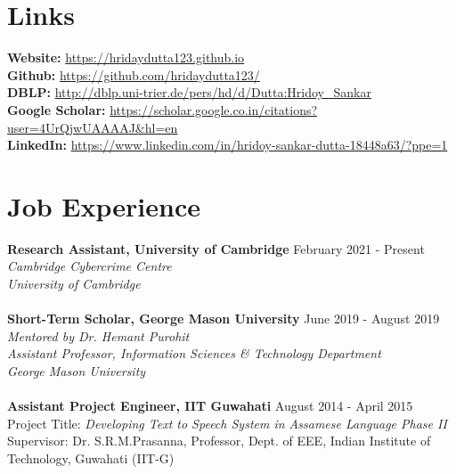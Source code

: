 \documentclass[margin, centered]{res}
\begin{document}
\begin{resume}
\section{Links}
\textbf{Website:} \url{https://hridaydutta123.github.io} \\
\textbf{Github:} \url{https://github.com/hridaydutta123/} \\
\textbf{DBLP:} \url{http://dblp.uni-trier.de/pers/hd/d/Dutta:Hridoy_Sankar} \\
\textbf{Google Scholar:} \url{https://scholar.google.co.in/citations?user=4UrQjwUAAAAJ&hl=en} \\
\textbf{LinkedIn:} \url{https://www.linkedin.com/in/hridoy-sankar-dutta-18448a63/?ppe=1} \\

\section{Job Experience}
\textbf{Research Assistant, University of Cambridge} \hfill February 2021 - Present\\
\emph{Cambridge Cybercrime Centre \\
University of Cambridge
} \\
\\
\textbf{Short-Term Scholar, George Mason University} \hfill June 2019 - August 2019\\
\emph{Mentored by Dr. Hemant Purohit\\
Assistant Professor, Information Sciences \& Technology Department \\ George Mason University}  \\
\\
\textbf{Assistant Project Engineer, IIT Guwahati} \hfill August 2014 - April 2015 \\
Project Title: \textit{Developing Text to Speech System in Assamese Language Phase II} \\
Supervisor: Dr. S.R.M.Prasanna, Professor, Dept. of EEE, Indian Institute of Technology, Guwahati (IIT-G)




\end{resume}
\end{document}
